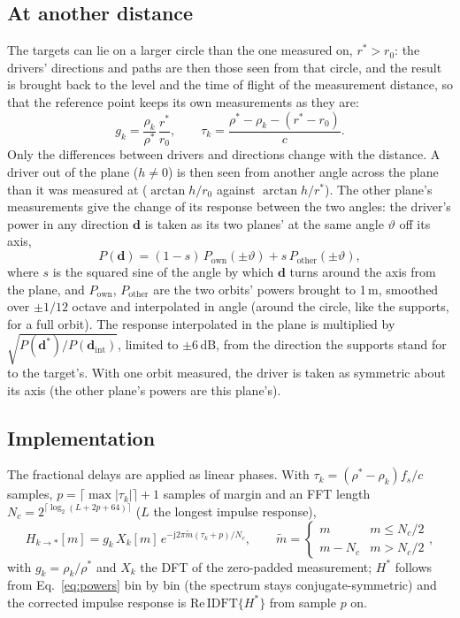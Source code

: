 \documentclass[11pt,a4paper]{article}
\newcommand{\vect}[1]{\mathbf{#1}}
\newcommand{\jj}{\mathrm{j}}
\begin{document}
\subsection{At another distance}
\label{sec:another}

The targets can lie on a larger circle than the one measured on, $r^*>r_0$: the drivers' directions and
paths are then those seen from that circle, and the result is brought back to the level and the time of
flight of the measurement distance, so that the reference point keeps its own measurements as they are:
\begin{equation}
  g_k=\frac{\rho_k}{\rho^*}\,\frac{r^*}{r_0},\qquad
  \tau_k=\frac{\rho^*-\rho_k-(r^*-r_0)}{c}.
\end{equation}
Only the differences between drivers and directions change with the distance. A driver out of the plane
($h\ne0$) is then seen from another angle across the plane than it was measured at ($\arctan h/r_0$
against $\arctan h/r^*$). The other plane's measurements give the change of its response between the two
angles: the driver's power in any direction $\vect d$ is taken as its two planes' at the same angle
$\vartheta$ off its axis,
\begin{equation}
  P(\vect d)=(1-s)\,P_\text{own}(\pm\vartheta)+s\,P_\text{other}(\pm\vartheta),
\end{equation}
where $s$ is the squared sine of the angle by which $\vect d$ turns around the axis from the plane, and
$P_\text{own}$, $P_\text{other}$ are the two orbits' powers brought to 1\,m, smoothed over $\pm1/12$
octave and interpolated in angle (around the circle, like the supports, for a full orbit). The response interpolated in the plane is multiplied by
$\sqrt{P(\vect d^*)/P(\vect d_\text{int})}$, limited to $\pm6$\,dB, from the direction the supports stand
for to the target's. With one orbit measured, the driver is taken as symmetric about its axis (the
other plane's powers are this plane's).

\subsection{Implementation}

The fractional delays are applied as linear phases. With $\tau_k=(\rho^*-\rho_k)f_s/c$ samples,
$p=\lceil\max|\tau_k|\rceil+1$ samples of margin and an FFT length $N_c=2^{\lceil\log_2(L+2p+64)\rceil}$
($L$ the longest impulse response),
\begin{equation}
  H_{k\to*}[m]=g_k\,X_k[m]\,e^{-\jj2\pi\tilde m(\tau_k+p)/N_c},\qquad
  \tilde m=\begin{cases}m & m\le N_c/2\\ m-N_c & m>N_c/2\end{cases},
\end{equation}
with $g_k=\rho_k/\rho^*$ and $X_k$ the DFT of the zero-padded measurement; $H^*$ follows from
Eq.~\eqref{eq:powers} bin by bin (the spectrum stays conjugate-symmetric) and the corrected impulse
response is $\mathrm{Re}\,\mathrm{IDFT}\{H^*\}$ from sample $p$ on.
\end{document}
